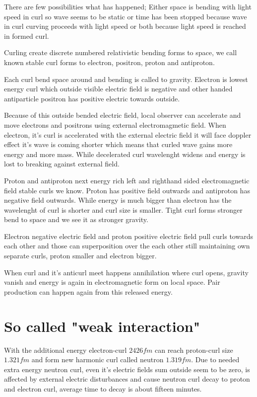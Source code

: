 There are few possibilities what has happened; Either space is bending with
light speed in curl so wave seems to be static or time has been stopped
because wave in curl curving proceeds with light speed or both because light
speed is reached in formed curl.

Curling create discrete numbered relativistic bending forms to space, we call
known stable curl forms to electron, positron, proton and antiproton.

Each curl bend space around and bending is called to gravity. Electron is
lowest energy curl which outside visible electric field is negative and other
handed antiparticle positron has positive electric towards outside.

Because of this outside bended electric field, local observer can accelerate
and move electrons and positrons using external electromagmetic field. When
electron, it's curl is accelerated with the external electric field it will
face doppler effect it's wave is coming shorter which means that curled wave
gains more energy and more mass. While decelerated curl wavelenght widens and
energy is lost to breaking against external field.

Proton and antiproton next energy rich left and righthand sided electromagnetic
field stable curls we know. Proton has positive field outwards and antiproton
has negative field outwards. While energy is much bigger than electron has the
wavelenght of curl is shorter and curl size is smaller. Tight curl forms
stronger bend to space and we see it as stronger gravity.

Electron negative electric field and proton positive electric field pull curls
towards each other and those can superposition over the each other still
maintaining own separate curls, proton smaller and electron bigger.

When curl and it's anticurl meet happens annihilation\cite{Annihilation} where
curl opens, gravity vanish and energy is again in electromagnetic form on local
space. Pair production\cite{PairProduction} can happen again from this released
energy.

\section{So called "weak interaction"}
\label{weak_interaction}

With the additional energy electron-curl $2426fm$\cite{ComptonWavelength}
can reach proton-curl size $1.321fm$ and form new harmonic curl called neutron
$1.319fm$. Due to needed extra energy neutron curl, even it's electric fields
sum outside seem to be zero, is affected by external electric disturbances and
cause neutron curl decay to proton and electron curl, average time to decay is
about fifteen minutes.

